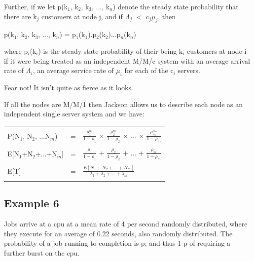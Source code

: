 \documentclass[12pt,fleqn]{report}
\begin{document}
Further, if we let p(k$_1$, k$_2$, k$_3$, ..., k$_n$) denote
the steady state probability that there are k$_j$ customers
at node j, and if $\Lambda_j$ $<$ c$_j$$\mu_j$, then


\begin{center}
p(k$_1$, k$_2$, k$_3$, ..., k$_n$) =
p$_1$(k$_1$).p$_2$(k$_2$)...p$_n$(k$_n$) 
\end{center}

\noindent
where p$_i$(k$_i$) is the steady state probability of 
their being k$_i$ customers at node i if it were being treated
as an independent M/M/c system  
with an average arrival rate of $\Lambda_i$,
an average service  rate of $\mu_i$ for each of the
c$_i$ servers.



Fear not! It isn't quite as fierce as it looks.

If all the nodes are M/M/1 then
Jackson allows us to describe each node as an independent single
server system and we have:

\begin{center}
\begin{tabular}{||l c l||}
\hline
&&\\
P(N$_1$, N$_2$, ...N$_m$) & = &
$\frac{\rho_1^{n_1}}{1-\rho_1}$ $\times$ $\frac{\rho_2^{n_2}}{1-\rho_2}$ $\times$ ... 
$\times$ $\frac{\rho_m^{n_m}}{1-\rho_m}$\\
&&\\
E[N$_1$+N$_2$+...+N$_m$] & = & 
$\frac{\rho_1}{1-\rho_1}$ + $\frac{\rho_2}{1-\rho_2}$ + ... 
+ $\frac{\rho_m}{1-\rho_m}$\\
&&\\
E[T] & = & $\frac{E[N_1+N_2+...+N_m]}{\lambda_1 + \lambda_2 + ... +
\lambda_m}$ \\
&&\\
\hline
\end{tabular}
\end{center}



\newpage
\subsection*{Example 6}

Jobs arrive at a cpu at a mean rate of 4 per second randomly
distributed, where they execute for an average of 0.22 seconds,
also randomly distributed.
The probability  of a job running to completion is p;
and thus 1-p of requiring a further burst on the cpu.
\end{document}

